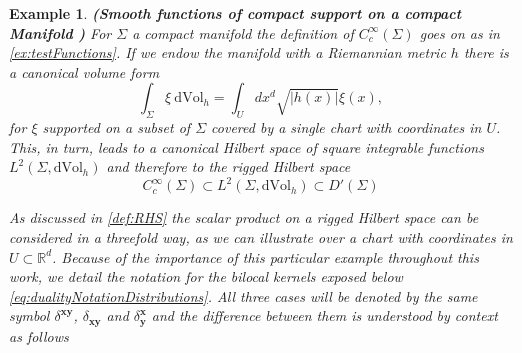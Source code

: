 \documentclass{elsarticle}%
\newtheorem{example}{Example}%
\begin{document}
\begin{example}\label{ex:testFunctionsManifold}{\bf (Smooth functions of compact support on a compact Manifold )} For $\Sigma$ a compact manifold the definition of $C^\infty_c(\Sigma)$ goes on as in \autoref{ex:testFunctions}. If we endow the manifold with a Riemannian metric $h$ there is a canonical volume form 
\begin{equation}
\label{eq:riemannianVolumeform}
\int_\Sigma \xi\ \mathrm{dVol}_h=\int_U dx^d \sqrt{\lvert h(x)\rvert} \xi(x),
\end{equation}
for $\xi$ supported on a subset of $\Sigma$ covered by  a single chart with coordinates in $U$. This, in turn, leads to a canonical Hilbert space of square integrable functions $L^2(\Sigma,\mathrm{dVol}_h)$ and therefore to the rigged Hilbert space 
\begin{equation}
\label{eq:riggedOnAManifold}
C^\infty_c(\Sigma)\subset L^2(\Sigma,\mathrm{dVol}_h) \subset D'(\Sigma)
\end{equation}  
  

As discussed in \autoref{def:RHS} the scalar product on a rigged Hilbert space can be considered in a threefold way, as we can illustrate over a chart with coordinates in $U\subset \mathbb{R}^d$. Because of the importance of this particular example throughout this work, we  detail the   notation for the bilocal kernels exposed below \eqref{eq:dualityNotationDistributions}. All three cases will be denoted by the same symbol $\delta^{\mathbf{xy}}$, $\delta_{\mathbf{xy}}$ and $\delta^{\mathbf{x}}_{\mathbf{y}}$ and the difference between them is understood by context as follows 


\end{example}
\end{document}
